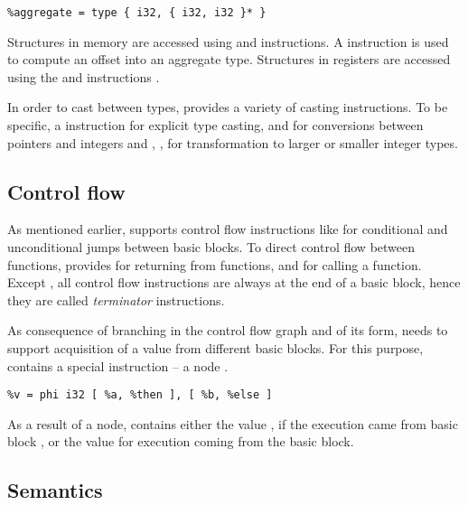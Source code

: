 \begin{verbatim}
%aggregate = type { i32, { i32, i32 }* }
\end{verbatim}

Structures in memory are accessed using  and  instructions.
A  instruction is used to compute an offset into an aggregate type.
Structures in registers are accessed using the  and 
instructions \cite{LLVM:langref}.

In order to cast between types, \LLVM provides a variety of casting instructions.
To be specific, a  instruction for explicit type casting,  and
 for conversions between pointers and integers and , ,
 for transformation to larger or smaller integer types.

\subsection{Control flow} \label{subsec:controlflow}

As mentioned earlier, \LLVM supports control flow instructions like  for
conditional and unconditional jumps between basic blocks. To direct control flow
between functions, \LLVM provides  for returning from functions,  and
 for calling a function. Except , all control flow instructions
are always at the end of a basic block, hence they are called \emph{terminator}
instructions.

As consequence of branching in the control flow graph and of its \SSA form, \LLVM needs to
support acquisition of a value from different basic blocks. For this
purpose, \LLVM contains a special instruction -- a  node \cite{Cytron91}.

\begin{verbatim}
%v = phi i32 [ %a, %then ], [ %b, %else ]
\end{verbatim}

As a result of a  node,  contains either the value ,
if the execution came from basic block , or the value  for execution
coming from the  basic block.

\subsection{Semantics} \label{subsec:semantics}

